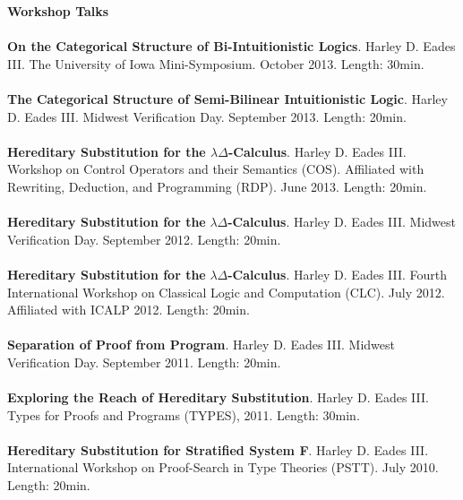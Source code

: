 \documentclass[line,margin]{res}
\begin{document}
\begin{resume}
                  \textbf{\large{Workshop Talks}}\\
                  \ \\                  
                  \textbf{On the Categorical Structure of Bi-Intuitionistic Logics}. Harley D. Eades III.
                  The University of Iowa Mini-Symposium. October 2013. Length: 30min.\\
                  \ \\
                  \textbf{The Categorical Structure of Semi-Bilinear Intuitionistic Logic}. Harley D. Eades III.
                  Midwest Verification Day. September 2013. Length: 20min.\\
                  \ \\
                  \textbf{Hereditary Substitution for the $\lambda\Delta$-Calculus}. Harley D. Eades III. 
                  Workshop on Control Operators and their Semantics (COS). 
                  Affiliated with Rewriting, Deduction, and Programming (RDP). June 2013. Length: 20min.\\
                  \ \\
                  \textbf{Hereditary Substitution for the }$\lambda\Delta$\textbf{-Calculus}. Harley D. Eades III.
                  Midwest Verification Day. September 2012. Length: 20min.\\
                  \ \\
                  \textbf{Hereditary Substitution for the }$\lambda\Delta$\textbf{-Calculus}. Harley D. Eades III.
                  Fourth International Workshop on Classical Logic and Computation (CLC). July 2012. Affiliated with ICALP 2012.
                  Length: 20min.\\
                  \ \\
                  \textbf{Separation of Proof from Program}.
                  Harley D. Eades III. Midwest Verification Day. September 2011. Length: 20min.\\
                  \ \\
                  \textbf{Exploring the Reach of Hereditary Substitution}. Harley D. Eades III.
                  Types for Proofs and Programs (TYPES), 2011. Length: 30min.\\
                  \ \\
                  \textbf{Hereditary Substitution for Stratified System F}. Harley D. Eades III. 
                  International Workshop on Proof-Search in Type Theories (PSTT). July 2010. Length: 20min.\\
                  

\end{resume}
\end{document}
